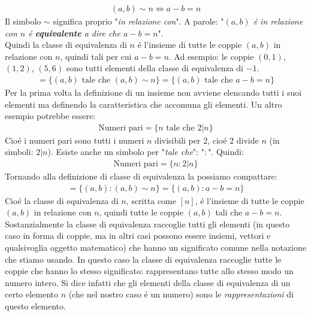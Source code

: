 \documentclass[twoside]{article} %
\begin{document}
	\begin{gather*}
		(a,b)\sim n\Leftrightarrow a-b=n
	\end{gather*}	
	Il simbolo $\sim$ significa proprio "\textit{in relazione con}". A parole: "\textit{$(a,b)$ \'e in relazione con $n$ \'e \textbf{equivalente} a dire che $a-b=n$}".\\
	Quindi la classe di equivalenza di $n$ \'e l'insieme di tutte le coppie $(a,b)$ in relazione con $n$, quindi tali per cui $a-b=n$. Ad esempio: le coppie $(0,1)$, $(1,2)$, $(5,6)$ sono tutti elementi della classe di equivalenza di $-1$.
	\begin{gather*}
		[n]=\{(a,b)\text{ tale che } (a,b)\sim n\}=\{(a,b)\text{ tale che } a-b= n\}
	\end{gather*}
	Per la prima volta la definizione di un insieme non avviene elencando tutti i suoi elementi ma definendo la caratteristica che accomuna gli elementi. 
	\newpage	
	\noindent Un altro esempio potrebbe essere:	
	\begin{gather*}
		\text{Numeri pari}=\{n\text{ tale che } 2|n\}
	\end{gather*}	
	Cio\'e i numeri pari sono tutti i numeri $n$ divisibili per $2$, cio\'e $2$ divide $n$ (in simboli: $2|n$). Esiste anche un simbolo per "\textit{tale che}": "$:$". Quindi:
	\begin{gather*}
		\text{Numeri pari}=\{n: 2|n\}
	\end{gather*}
	Tornando alla definizione di classe di equivalenza la possiamo compattare:
	\begin{gather*}
		[n]=\{(a,b):(a,b)\sim n\}=\{(a,b): a-b=n\}
	\end{gather*}	
	Cio\'e la classe di equivalenza di $n$, scritta come $[n]$, \'e l'insieme di tutte le coppie $(a,b)$ in relazione con $n$, quindi tutte le coppie $(a,b)$ tali che $a-b=n$. Sostanzialmente la classe di equivalenza raccoglie tutti gli elementi (in questo caso in forma di coppie, ma in altri casi possono essere insiemi, vettori e qualsivoglia oggetto matematico) che hanno un significato comune nella notazione che stiamo usando. In questo caso la classe di equivalenza raccoglie tutte le coppie che hanno lo stesso significato: rappresentano tutte allo stesso modo un numero intero. Si dice infatti che gli elementi della classe di equivalenza di un certo elemento $n$ (che nel nostro caso \'e un numero) sono le \textit{rappresentazioni} di questo elemento.
	\newpage 
\end{document}
